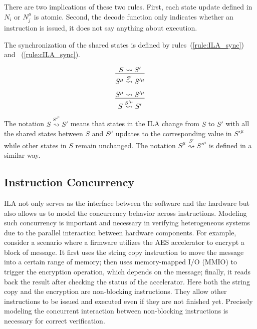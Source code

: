 There are two implications of these two rules.
First, each state update defined in $N_i$ or $N_j^\mu$ is atomic.
Second, the decode function only indicates whether an instruction is issued, it 
does not say anything about execution.

The synchronization of the shared states is defined by 
rules~(\ref{rule:ILA_sync}) and ~(\ref{rule:cILA_sync}).

\begin{equation}
  \infer{S^\mu \overset{S'}{\rightsquigarrow} S'^\mu}
        {S \rightsquigarrow S'}
  \label{rule:ILA_sync}
\end{equation}

\begin{equation}
  \infer{S \overset{S'^\mu}{\rightsquigarrow} S'}
        {S^\mu \rightsquigarrow S'^\mu}
  \label{rule:cILA_sync}
\end{equation}

The notation $S \overset{S'^\mu}{\rightsquigarrow} S'$ means that states in the 
ILA change from $S$ to $S'$ with all the shared states between $S$ and $S^\mu$
updates to the corresponding value in $S'^\mu$ while other states in $S$ remain 
unchanged.
The notation $S^\mu \overset{S'}{\rightsquigarrow} S'^\mu$ is defined in a 
similar way.

\subsection*{Instruction Concurrency}


ILA not only serves as the interface between the software and the hardware but 
also allows us to model the concurrency behavior across instructions. 
Modeling such concurrency is important and necessary in verifying heterogeneous 
systems due to the parallel interaction between hardware components.
%
For example, consider a scenario where a firmware utilizes the AES accelerator
to encrypt a block of message. 
It first uses the string copy instruction to move the message into a certain
range of memory; then uses memory-mapped I/O (MMIO) to trigger the encryption
operation, which depends on the message; finally, it reads back the result after
checking the status of the accelerator.
%
Here both the string copy and the encryption are non-blocking instructions. 
They allow other instructions to be issued and executed even if they are not
finished yet.
Precisely modeling the concurrent interaction between non-blocking instructions 
is necessary for correct verification.

